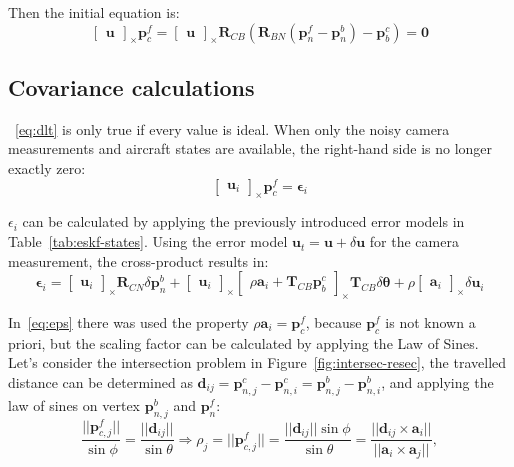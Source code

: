 Then the initial equation is:
\begin{equation}
    \begin{bmatrix}
        \mathbf{u}
    \end{bmatrix}_\times\mathbf{p}_c^f=\begin{bmatrix}
        \mathbf{u}
    \end{bmatrix}_\times\mathbf{R}_{CB}(\mathbf{R}_{BN}(\mathbf{p}_n^f-\mathbf{p}_n^b)-\mathbf{p}_b^c)=\mathbf{0}
\end{equation}\label{eq:dlt}

\subsection{Covariance calculations}

~\eqref{eq:dlt} is only true if every value is ideal. When only the noisy camera measurements and aircraft states are available, the right-hand side is no longer exactly zero:
\begin{equation}
    \begin{bmatrix}
        \mathbf{u}_i
    \end{bmatrix}_\times\mathbf{p}_c^f=\boldsymbol{\epsilon}_i
\end{equation}

$\epsilon_i$ can be calculated by applying the previously introduced error models in Table~\ref{tab:eskf-states}. Using the error model $\mathbf{u}_t=\mathbf{u}+\delta\mathbf{u}$ for the camera measurement, the cross-product results in:
\begin{equation}
    \boldsymbol{\epsilon}_i=\begin{bmatrix}
        \mathbf{u}_i
    \end{bmatrix}_\times\mathbf{R}_{CN}\delta\mathbf{p}_n^b +
    \begin{bmatrix}
        \mathbf{u}_i
    \end{bmatrix}_\times
    \begin{bmatrix}
    \rho\mathbf{a}_i+\mathbf{T}_{CB}\mathbf{p}_b^c
    \end{bmatrix}_\times\mathbf{T}_{CB}\delta\boldsymbol{\theta}+\rho\begin{bmatrix}
        \mathbf{a}_i
    \end{bmatrix}_\times\delta\mathbf{u}_i
    \label{eq:eps}
\end{equation}


In~\eqref{eq:eps} there was used the property $\rho\mathbf{a}_i = \mathbf{p}_c^f$, because $\mathbf{p}_c^f$ is not known a priori, but the scaling factor can be calculated by applying the Law of Sines. Let's consider the intersection problem in Figure~\ref{fig:intersec-resec}, the travelled distance can be determined as $\mathbf{d}_{ij}=\mathbf{p}_{n,j}^c-\mathbf{p}_{n, i}^c = \mathbf{p}_{n,j}^b-\mathbf{p}_{n, i}^b$, and applying the law of sines on vertex $\mathbf{p}_{n,j}^b$ and $\mathbf{p}_n^f$:
\begin{equation}
    \frac{||\mathbf{p}_{c,j}^f||}{\sin\phi}=\frac{||\mathbf{d}_{ij}||}{\sin\theta}\Rightarrow \rho_j=||\mathbf{p}_{c,j}^f||=\frac{||\mathbf{d}_{ij}||\sin\phi}{\sin\theta} =
    \frac{||\mathbf{d}_{ij}\times\mathbf{a}_i||}{||\mathbf{a}_i\times\mathbf{a}_j||},
\end{equation}

